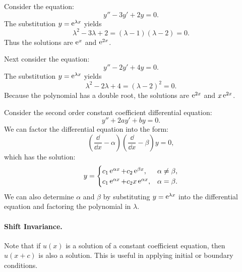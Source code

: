 \begin{Example}
  Consider the equation:
  \[ 
  y'' - 3 y' + 2y = 0.
  \]
  The substitution $y = \mathop{\mathrm{e}}\nolimits^{\lambda x}$ yields
  \[
  \lambda^2 - 3 \lambda + 2 = (\lambda-1)(\lambda-2) = 0.
  \]
  Thus the solutions are $\mathop{\mathrm{e}}\nolimits^x$ and $\mathop{\mathrm{e}}\nolimits^{2x}$.
\end{Example}






\begin{Example}
  Next consider the equation:
  \[ 
  y'' - 2 y' + 4 y = 0.
  \]
  The substitution $y = \mathop{\mathrm{e}}\nolimits^{\lambda x}$ yields
  \[
  \lambda^2 - 2 \lambda + 4 = (\lambda-2)^2 = 0.
  \]
  Because the polynomial has a double root, the solutions are 
  $\mathop{\mathrm{e}}\nolimits^{2x}$ and $x \mathop{\mathrm{e}}\nolimits^{2x}$.
\end{Example}







\begin{Result}
  \label{second order constant coefficient factor}
  Consider the second order constant coefficient differential equation:
  \[
  y'' + 2 a y' + b y = 0.
  \]
  We can factor the differential equation into the form:
  \[
  \left( \frac{\dd}{\dd x} - \alpha \right) 
  \left( \frac{\dd}{\dd x} - \beta \right) y = 0,
  \]
  which has the solution:
  \[
  y = \begin{cases}
    c_1 \mathop{\mathrm{e}}\nolimits^{\alpha x} + c_2 \mathop{\mathrm{e}}\nolimits^{\beta x}, &\alpha \neq \beta, \\
    c_1 \mathop{\mathrm{e}}\nolimits^{\alpha x} + c_2 x \mathop{\mathrm{e}}\nolimits^{\alpha x}, &\alpha = \beta.
  \end{cases}
  \]
  We can also determine $\alpha$ and $\beta$ by substituting $y = \mathop{\mathrm{e}}\nolimits^{\lambda x}$ into the 
  differential equation and factoring the polynomial in $\lambda$.
\end{Result}








\paragraph{Shift Invariance.}
Note that if $u(x)$ is a solution of a constant coefficient equation,
then $u(x+c)$ is also a solution.  This is useful in applying 
initial or boundary conditions.





